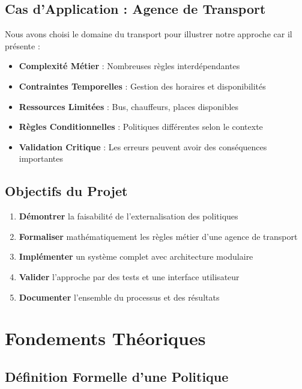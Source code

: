 \documentclass[12pt,a4paper]{article}
\begin{document}
    \subsection{Cas d'Application : Agence de Transport}

    Nous avons choisi le domaine du transport pour illustrer notre approche car il présente :

    \begin{itemize}
        \item \textbf{Complexité Métier} : Nombreuses règles interdépendantes
        \item \textbf{Contraintes Temporelles} : Gestion des horaires et disponibilités
        \item \textbf{Ressources Limitées} : Bus, chauffeurs, places disponibles
        \item \textbf{Règles Conditionnelles} : Politiques différentes selon le contexte
        \item \textbf{Validation Critique} : Les erreurs peuvent avoir des conséquences importantes
    \end{itemize}

    \subsection{Objectifs du Projet}

    \begin{enumerate}
        \item \textbf{Démontrer} la faisabilité de l'externalisation des politiques
        \item \textbf{Formaliser} mathématiquement les règles métier d'une agence de transport
        \item \textbf{Implémenter} un système complet avec architecture modulaire
        \item \textbf{Valider} l'approche par des tests et une interface utilisateur
        \item \textbf{Documenter} l'ensemble du processus et des résultats
    \end{enumerate}

    \newpage

    \section{Fondements Théoriques}

    \subsection{Définition Formelle d'une Politique}
\end{document}
